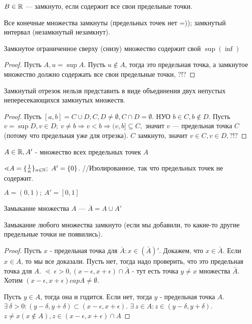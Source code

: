 \documentclass[12pt]{report}
\begin{document}
\begin{defn}
$B \in \mathbb{R}$ --- замкнуто, если содержит все свои предельные точки. 
\end{defn}

\begin{ex}
Все конечные множества замкнуты (предельных точек нет =)); замкнутый интервал (незамкнутый незамкнут).
\end{ex}

\begin{cor}
Замкнутое ограниченное сверху (снизу) множество содержит свой $\sup (\inf)$
\end{cor}
\begin{proof}
Пусть $A, u = \sup{A}$. Пусть $u \notin A$, тогда это предельная точка, а замкнутое множество должно содержать все свои предельные точки, ?!?
\end{proof}

\begin{thm}
Замкнутый отрезок нельзя представить в виде объединения двух непустых непересекающихся замкнутых множеств.
\end{thm}
\begin{proof}
Пусть $[a, b] = C \cup D, C, D \neq \emptyset, C \cap D = \emptyset$. НУО $b \in C, b \notin D$. Пусть $v = \sup{D}, v \in D; ~v \neq b \Rightarrow v < b \Rightarrow (v, b] \subseteq C,$ значит $v$ --- предельная точка $C$ (потому что предельная уже для отрезка). $C$ замкнуто, значит $v \in C, v \in D, ?!?$
\end{proof}

\begin{ex}
$A \in \mathbb{R}, A'$ - множество всех предельных точек $A$

$\lessdot A = \{\frac{1}{n}\}_{n \in \mathbb{N}}; ~A' = \{0\}$. //Изолированное, так что предельных точек не содержит.

$A = (0, 1); ~A' = [0, 1]$
\end{ex}

\begin{defn}
Замыкание множества $A$ --- $\bar{A} = A \cup A'$
\end{defn}

\begin{lm}
Замыкание любого множества замкнуто (если мы добавили, то какие-то другие предельные точки не появились).
\end{lm}
\begin{proof}
Пусть $x$ - предельная точка для $\bar{A}: x \in (\bar{A})'$. Докажем, что $x \in \bar{A}$. Если $x \in A$, то мы все доказали. Пусть нет, тогда надо проверить, что это предельная точка для $A$. $\lessdot ~\epsilon > 0, (x - \epsilon, x + \epsilon) \cap \bar{A}$ - тут есть точка $y \neq x$ множества $\bar{A}$. Хотим $(x - \epsilon, x + \epsilon) cap A \neq \emptyset$. 

Пусть $y \in A$, тогда она и годится. Если нет, тогда $y$ - предельная точка $A$. $\exists ~\delta > 0: (y - \delta, y + \delta) \subset (x - \epsilon, x + \epsilon)$. $\exists ~z \in A: z \in (y - \delta, y + \delta)$. $z \neq x (x \notin A), z \in (x - \epsilon, x + \epsilon) \cap A$
\end{proof}
\end{document}
